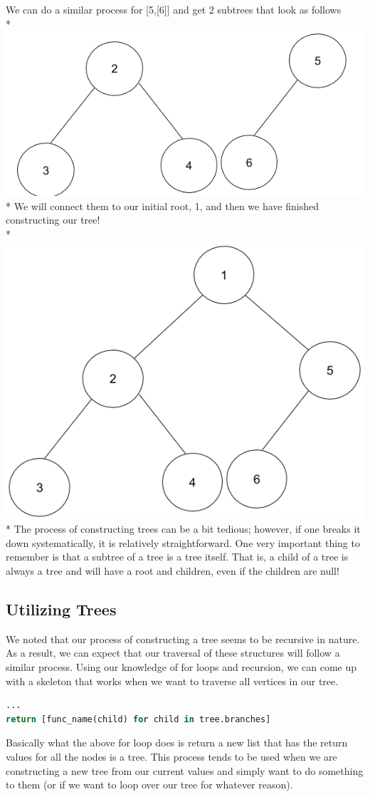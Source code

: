 \documentclass{article}
\begin{document}
We can do a similar process for [5,[6]] and get 2 subtrees that look as follows  \\*
\includegraphics[scale=.34]{../images/treeex5.png} \\*
We will connect them to our initial root, 1, and then we have finished constructing our tree! \\*
\includegraphics[scale=.34]{../images/treeexample.png}  \\*
The process of constructing trees can be a bit tedious; however, if one breaks it down systematically, it is relatively straightforward. One very important thing to remember is that a subtree of a tree is a tree itself. That is, a child of a tree is always a tree and will have a root and children, even if the children are null! 
\subsection{Utilizing Trees}
We noted that our process of constructing a tree seems to be recursive in nature. As a result, we can expect that our traversal of these structures will follow a similar process. Using our knowledge of for loops and recursion, we can come up with a skeleton that works when we want to traverse all vertices in our tree. 
\begin{lstlisting}[language = Python]
...
return [func_name(child) for child in tree.branches]
\end{lstlisting}
Basically what the above for loop does is return a new list that has the return values for all the nodes is a tree. This process tends to be used when we are constructing a new tree from our current values and simply want to do something to them (or if we want to loop over our tree for whatever reason).
\end{document}
